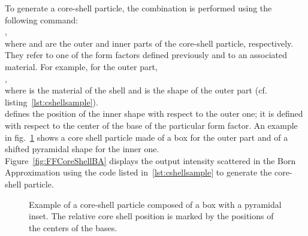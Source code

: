 To generate a core-shell particle, the combination is performed using the following command:\\
,\\
where  and  are the outer and inner parts of the core-shell particle, respectively. They refer to one of the form factors defined previously and to an associated material. For example, for the outer part,\\ ,\\ where  is the material of the shell and  is the shape of the outer part (cf. listing~\ref{lst:cshellsample}). \\  defines the position of the inner shape with respect to the outer one; it is defined with respect to the center of the base of the particular form factor. An example in fig.~\ref{fig:coreshell} shows a core shell particle made of a box for the outer part and of a shifted pyramidal shape for the inner one.\\

Figure~\ref{fig:FFCoreShellBA} displays the output intensity scattered in the Born Approximation using the code listed in~\ref{lst:cshellsample} to generate the core-shell particle. 

\begin{figure}[ht]
\hfill
{}
\hfill
{}
\hfill
\caption{Example of a core-shell particle composed of a box with a pyramidal  inset. The relative core shell position is marked by the positions of the centers of the bases. }
\label{fig:coreshell}
\end{figure}

